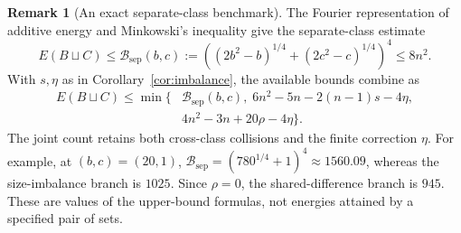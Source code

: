 \documentclass[11pt,a4paper]{article}
\newif\ifshowrevisions
\newenvironment{revision}{\par\begingroup\ifshowrevisions\color{red}\fi}{\par\endgroup}
\theoremstyle{definition}
\newtheorem*{remark}{Remark}
\numberwithin{equation}{section}
\begin{document}
\begin{revision}
\begin{remark}[An exact separate-class benchmark]
The Fourier representation of additive energy and Minkowski's inequality
\cite{TV06} give the separate-class estimate
\[
E(B\sqcup C)\le\mathcal B_{\mathrm{sep}}(b,c)
:=\left((2b^2-b)^{1/4}+(2c^2-c)^{1/4}\right)^4\le8n^2.
\]
With $s,\eta$ as in Corollary~\ref{cor:imbalance}, the available bounds combine as
\begin{equation}\label{eq:complete-energy-comparison}
\begin{split}
E(B\sqcup C)\le\min\bigl\{&\mathcal B_{\mathrm{sep}}(b,c),\;
6n^2-5n-2(n-1)s-4\eta,\\
&4n^2-3n+20\rho-4\eta\bigr\}.
\end{split}
\end{equation}
The joint count retains both cross-class collisions and the finite
correction $\eta$. For example, at $(b,c)=(20,1)$,
$\mathcal B_{\mathrm{sep}}=(780^{1/4}+1)^4\approx1560.09$,
whereas the size-imbalance branch is $1025$. Since $\rho=0$, the
shared-difference branch is $945$. These are values of the upper-bound
formulas, not energies attained by a specified pair of sets.
\end{remark}
\end{revision}
\end{document}
